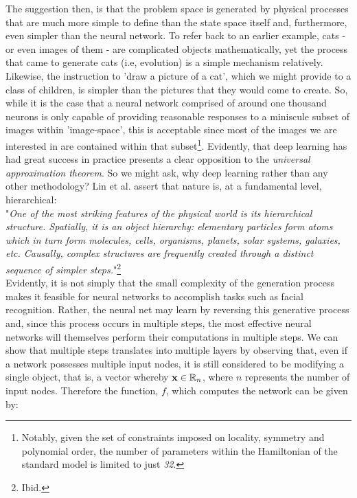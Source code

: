 \documentclass[11pt]{article}
\begin{document}
The suggestion then, is that the problem space is generated by physical processes that are much more simple to define than the state space itself and, furthermore, even simpler than the neural network. To refer back to an earlier example, cats - or even images of them - are complicated objects mathematically, yet the process that came to generate cats (i.e, evolution) is a simple mechanism relatively. Likewise, the instruction to 'draw a picture of a cat', which we might provide to a class of children, is simpler than the pictures that they would come to create. So, while it is the case that a neural network comprised of around one thousand neurons is only capable of providing reasonable responses to a miniscule subset of images within 'image-space', this is acceptable since most of the images we are interested in are contained within that subset\footnote{Notably, given the set of constraints imposed on locality, symmetry and polynomial order, the number of parameters within the Hamiltonian of the standard model is limited to just \textit{32}.}. Evidently, that deep learning has had great success in practice presents a clear opposition to the \textit{universal approximation theorem}. So we might ask, why deep learning rather than any other methodology? Lin et al. assert that nature is, at a fundamental level, hierarchical:\\

"\textit{One of the most striking features of the physical world is its hierarchical structure. Spatially, it is an object hierarchy: elementary particles form atoms which in turn form molecules, cells, organisms, planets, solar systems, galaxies, etc. Causally, complex structures are frequently created through a distinct sequence of simpler steps.}"\footnote{Ibid.}\\

Evidently, it is not simply that the small complexity of the generation process makes it feasible for neural networks to accomplish tasks such as facial recognition. Rather, the neural net may learn by reversing this generative process and, since this process occurs in multiple steps, the most effective neural networks will themselves perform their computations in multiple steps.  We can show that multiple steps translates into multiple layers by observing that, even if a network possesses multiple input nodes, it is still considered to be modifying a single object, that is, a vector whereby $\textup{\textbf{x}} \in \mathbb{R}_{n}$, where $n$ represents the number of input nodes. Therefore the function, $f$, which computes the network can be given by:
\end{document}
